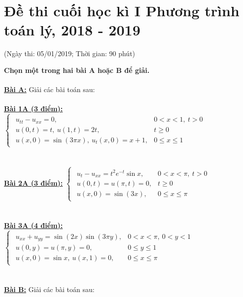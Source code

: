 \documentclass[10.5pt, a4paper]{article}
\begin{document}
\section{Đề thi cuối học kì I Phương trình toán lý, 2018 - 2019}
\begin{center}
	\color{blue}(Ngày thi: 05/01/2019; Thời gian: 90 phút)
\end{center}
\textbf{Chọn một trong hai bài A hoặc B để giải.}\\\\
\color{red}\underline{\textbf{Bài A:}} \color{black}Giải các bài toán sau:\\\\
\color{red}\underline{\textbf{Bài 1A (3 điểm):}} \color{black}$\begin{cases}
\begin{array}{ll}
u_{tt}-u_{xx}=0, & 0<x<1,~t>0\\
u(0,t)=t,~u(1,t)=2t, & t\ge0\\
u(x,0)=\sin(3\pi x),~u_t(x,0)=x+1, & 0\le x\le1
\end{array}
\end{cases}$\\\\\\
\color{red}\underline{\textbf{Bài 2A (3 điểm):}} \color{black}$\begin{cases}
\begin{array}{ll}
u_t-u_{xx}=t^2e^{-t}\sin x, & 0<x<\pi,~t>0\\
u(0,t)=u(\pi,t)=0, & t\ge0\\
u(x,0)=\sin(3x), & 0\le x\le\pi
\end{array}
\end{cases}$\\\\\\
\color{red}\underline{\textbf{Bài 3A (4 điểm):}} \color{black}$\begin{cases}
\begin{array}{ll}
u_{xx}+u_{yy}=\sin(2x)\sin(3\pi y), & 0<x<\pi,~0<y<1\\
u(0,y)=u(\pi,y)=0, & 0\le y\le1\\
u(x,0)=\sin x,~u(x,1)=0, & 0\le x\le\pi
\end{array}
\end{cases}$\\\\\\
\color{red}\underline{\textbf{Bài B:}} \color{black}Giải các bài toán sau:\\\\
\end{document}
